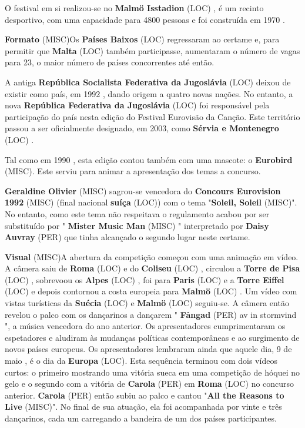\documentclass[12pt,a4paper]{article}
\begin{document}
O festival em si realizou-se no \textbf{Malmö Isstadion} (LOC) , é um recinto desportivo, com uma capacidade para 4800 pessoas e foi construída em 1970 .



\textbf{Formato} (MISC)Os \textbf{Países Baixos} (LOC) regressaram ao certame e, para permitir que \textbf{Malta} (LOC) também participasse, aumentaram o número de vagas para 23, o maior número de países concorrentes até então.

A antiga \textbf{República Socialista Federativa da Jugoslávia} (LOC) deixou de existir como país, em 1992 , dando origem a quatro novas nações. No entanto, a nova \textbf{República Federativa da Jugoslávia} (LOC) foi responsável pela participação do país nesta edição do Festival Eurovisão da Canção. Este território passou a ser oficialmente designado, em 2003, como \textbf{Sérvia e Montenegro} (LOC) .

Tal como em 1990 , esta edição contou também com uma mascote: o \textbf{Eurobird} (MISC). Este serviu para animar a apresentação dos temas a concurso.

\textbf{Geraldine Olivier} (MISC) sagrou-se vencedora do \textbf{Concours Eurovision 1992} (MISC) (final nacional \textbf{suíça} (LOC)) com o tema "\textbf{Soleil, Soleil} (MISC)". No entanto, como este tema não respeitava o regulamento acabou por ser substituído por " \textbf{Mister Music Man} (MISC) " interpretado por \textbf{Daisy Auvray} (PER) que tinha alcançado o segundo lugar neste certame.



\textbf{Visual} (MISC)A abertura da competição começou com uma animação em vídeo. A câmera saiu de \textbf{Roma} (LOC) e do \textbf{Coliseu} (LOC) , circulou a \textbf{Torre de Pisa} (LOC) , sobrevoou os \textbf{Alpes} (LOC) , foi para \textbf{Paris} (LOC) e a \textbf{Torre Eiffel} (LOC) e depois contornou a costa europeia para \textbf{Malmö} (LOC) . Um vídeo com vistas turísticas da \textbf{Suécia} (LOC) e \textbf{Malmö} (LOC) seguiu-se. A câmera então revelou o palco com os dançarinos a dançarem " \textbf{Fångad} (PER) av in stormvind ", a música vencedora do ano anterior. Os apresentadores cumprimentaram os espetadores e aludiram às mudanças políticas contemporâneas e ao surgimento de novos países europeus. Os apresentadores lembraram ainda que aquele dia, 9 de maio , é o dia da \textbf{Europa} (LOC). Esta sequência terminou com dois vídeos curtos: o primeiro mostrando uma vitória sueca em uma competição de hóquei no gelo e o segundo com a vitória de \textbf{Carola} (PER) em \textbf{Roma} (LOC) no concurso anterior. \textbf{Carola} (PER) então subiu ao palco e cantou "\textbf{All the Reasons to Live} (MISC)". No final de sua atuação, ela foi acompanhada por vinte e três dançarinos, cada um carregando a bandeira de um dos países participantes.
\end{document}
